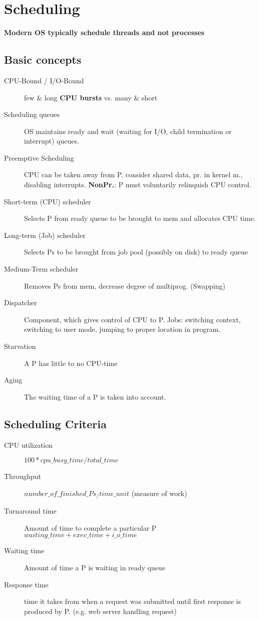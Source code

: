 \section*{Scheduling}
\textbf{Modern OS typically schedule threads and not processes} %
\subsection*{Basic concepts}
\begin{description}
  \item[CPU-Bound / I/O-Bound]few \& long \textbf{CPU bursts} vs. many \& short
  \item[Scheduling queues]OS maintains ready and wait (waiting for I/O, child termination or interrupt) queues.
  \item[Preemptive Scheduling] CPU can be taken away from P. consider shared data, pr. in kernel m., disabling interrupts. \textbf{NonPr.}: P must voluntarily relinquish CPU control. %
  \item[Short-term (CPU) scheduler] Selects P from ready queue to be brought to mem and allocates CPU time.
  \item[Long-term (Job) scheduler] Selects Ps to be brought from job pool (possibly on disk) to ready queue
  \item[Medium-Term scheduler] Removes Ps from mem, decrease degree of multiprog. (Swapping)
  \item[Dispatcher] Component, which gives control of CPU to P. Jobs: switching context, switching to user mode, jumping to proper location in program.
  \item[Starvation] A P has little to no CPU-time
  \item[Aging] The waiting time of a P is taken into account.
\end{description}

\subsection*{Scheduling Criteria}
\begin{description}
  \item[CPU utilization] $100 * cpu\_busy\_time / total\_time$
  \item[Throughput] $number\_of\_finished\_Ps_/time\_unit$ (measure of work)
  \item[Turnaround time] Amount of time to complete a particular P $waiting\_time+exec\_time+i\_o\_time$
  \item[Waiting time] Amount of time a P is waiting in ready queue
  \item[Response time] time it takes from when a request was submitted until first response is produced by P. (e.g. web server handling request)
\end{description}

